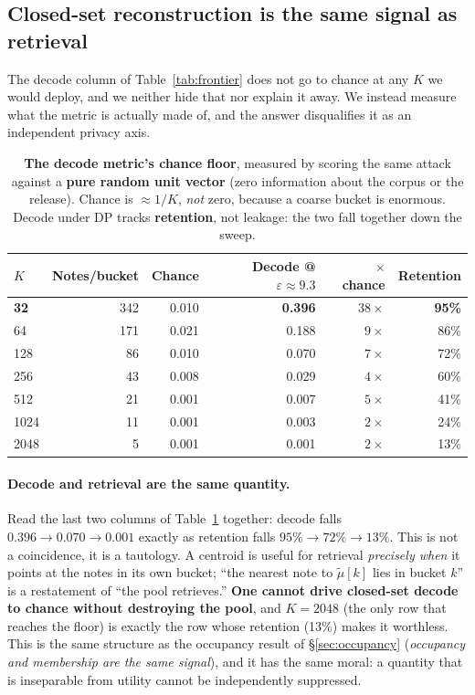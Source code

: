 \documentclass[pdflatex,sn-mathphys-num,iicol]{sn-jnl}
\theoremstyle{thmstyleone}%
\theoremstyle{thmstyletwo}%
\theoremstyle{thmstylethree}%
\newcommand{\eps}{\varepsilon}
\newcommand{\secref}[1]{\S\ref{#1}}
\begin{document}
\subsection{Closed-set reconstruction is the same signal as retrieval}\label{sec:decode-floor}

The decode column of Table~\ref{tab:frontier} does not go to chance at any $K$ we would
deploy, and we neither hide that nor explain it away. We instead measure what the metric is
actually made of, and the answer disqualifies it as an independent privacy axis.

\begin{table}[t]
  \centering
  \caption{\textbf{The decode metric's chance floor}, measured by scoring the same attack
  against a \textbf{pure random unit vector} (zero information about the corpus or the
  release). Chance is $\approx 1/K$, \emph{not} zero, because a coarse bucket is enormous.
  Decode under DP tracks \textbf{retention}, not leakage: the two fall together down the sweep.}
  \label{tab:decode-floor}
  \small
  \begin{tabular}{@{}lrrrrr@{}}
    \toprule
    $K$ & Notes/bucket & Chance & Decode @ $\eps \approx 9.3$ & $\times$ chance & Retention \\
    \midrule
    \textbf{32} & 342 & 0.010 & \textbf{0.396} & $38\times$ & \textbf{95\%} \\
    64          & 171 & 0.021 & 0.188 & $9\times$ & 86\% \\
    128         & 86  & 0.010 & 0.070 & $7\times$ & 72\% \\
    256         & 43  & 0.008 & 0.029 & $4\times$ & 60\% \\
    512         & 21  & 0.001 & 0.007 & $5\times$ & 41\% \\
    1024        & 11  & 0.001 & 0.003 & $2\times$ & 24\% \\
    2048        & 5   & 0.001 & 0.001 & $2\times$ & 13\% \\
    \bottomrule
  \end{tabular}
\end{table}

\paragraph{Decode and retrieval are the same quantity.} Read the last two columns of
Table~\ref{tab:decode-floor} together: decode falls $0.396 \to 0.070 \to 0.001$ exactly as
retention falls $95\% \to 72\% \to 13\%$. This is not a coincidence, it is a tautology. A
centroid is useful for retrieval \emph{precisely when} it points at the notes in its own
bucket; ``the nearest note to $\tilde\mu[k]$ lies in bucket $k$'' is a restatement of ``the
pool retrieves.'' \textbf{One cannot drive closed-set decode to chance without destroying the
pool}, and $K = 2048$ (the only row that reaches the floor) is exactly the row whose
retention (13\%) makes it worthless. This is the same structure as the occupancy result of
\secref{sec:occupancy} (\emph{occupancy and membership are the same signal}), and it has the
same moral: a quantity that is inseparable from utility cannot be independently suppressed.
\end{document}
